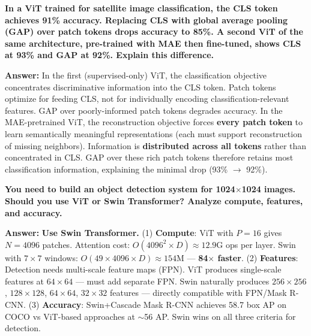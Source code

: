 \begin{examq}
\textbf{In a ViT trained for satellite image classification, the CLS token achieves 91\% accuracy. Replacing CLS with global average pooling (GAP) over patch tokens drops accuracy to 85\%. A second ViT of the same architecture, pre-trained with MAE then fine-tuned, shows CLS at 93\% and GAP at 92\%. Explain this difference.}

\textbf{Answer:} In the first (supervised-only) ViT, the classification objective concentrates discriminative information into the CLS token. Patch tokens optimize for feeding CLS, not for individually encoding classification-relevant features. GAP over poorly-informed patch tokens degrades accuracy. In the MAE-pretrained ViT, the reconstruction objective forces \textbf{every patch token} to learn semantically meaningful representations (each must support reconstruction of missing neighbors). Information is \textbf{distributed across all tokens} rather than concentrated in CLS. GAP over these rich patch tokens therefore retains most classification information, explaining the minimal drop (93\% $\to$ 92\%).
\end{examq}

\begin{examq}
\textbf{You need to build an object detection system for 1024$\times$1024 images. Should you use ViT or Swin Transformer? Analyze compute, features, and accuracy.}

\textbf{Answer:} \textbf{Use Swin Transformer.} (1) \textbf{Compute}: ViT with $P{=}16$ gives $N{=}4096$ patches. Attention cost: $O(4096^2 \times D) \approx 12.9\text{G}$ ops per layer. Swin with $7{\times}7$ windows: $O(49 \times 4096 \times D) \approx 154\text{M}$ — \textbf{84$\times$ faster}. (2) \textbf{Features}: Detection needs multi-scale feature maps (FPN). ViT produces single-scale features at $64{\times}64$ — must add separate FPN. Swin naturally produces $256{\times}256$, $128{\times}128$, $64{\times}64$, $32{\times}32$ features — directly compatible with FPN/Mask R-CNN. (3) \textbf{Accuracy}: Swin+Cascade Mask R-CNN achieves 58.7 box AP on COCO vs ViT-based approaches at $\sim$56 AP. Swin wins on all three criteria for detection.
\end{examq}

